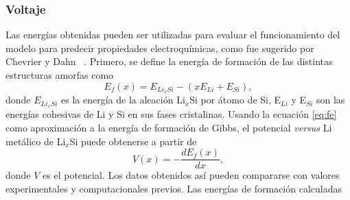 \subsubsection{Voltaje}

\begin{table}[h]
    \centering
    \caption{Energías de formación obtenidas a través de la ecuación \ref{eq:fe}}
    \setlength\extrarowheight{2pt}
    \label{t:fe}
\end{table}
Las energías obtenidas pueden ser utilizadas para evaluar el funcionamiento del 
modelo para predecir propiedades electroquímicas, como fue sugerido por Chevrier
y Dahn ~\cite{chevrier2009}. Primero, se define la energía de formación de las 
distintas estructuras amorfas como
\begin{equation}\label{eq:fe}
    E_f(x) = E_{Li_xSi} - (x E_{Li} + E_{Si}),
\end{equation}
donde $E_{Li_xSi}$ es la energía de la aleación Li$_x$Si por átomo de Si, E$_{Li}$
y E$_{Si}$ son las energías cohesivas de Li y Si en sus fases cristalinas. Usando
la ecuación \ref{eq:fe} como aproximación a la energía de formación de Gibbs, el 
potencial \textit{versus} Li metálico de Li$_x$Si puede obtenerse a partir de
\begin{equation}\label{eq:voltaje}
    V(x) = - \frac{dE_f(x)}{dx},
\end{equation}
donde $V$ es el potencial. Los datos obtenidos así pueden compararse con valores
experimentales y computacionales previos. Las energías de formación calculadas
